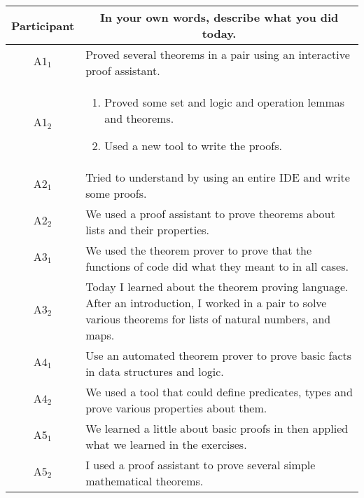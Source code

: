 \noindent
\begin{tabularx}{\linewidth}{@{}cX@{}}
  \toprule
  Participant & \multicolumn{1}{c}{
    \textbf{In your own words, describe what you did today.}
  } \\ \midrule
  $\text{A}1_{1}$ & Proved several theorems in a pair using an interactive proof assistant. \\
  $\text{A}1_{2}$ & \begin{enumerate} \item Proved some set and logic and operation lemmas and theorems. \item Used a new tool to write the proofs. \end{enumerate} \\
  $\text{A}2_{1}$ & Tried to understand \Coq{} by using an entire IDE and write some proofs. \\
  $\text{A}2_{2}$ & We used a proof assistant to prove theorems about lists and their properties. \\
  $\text{A}3_{1}$ & We used the theorem prover to prove that the functions of code did what they meant to in all cases. \\
  $\text{A}3_{2}$ & Today I learned about the \Coq{} theorem proving language.  After an introduction, I worked in a pair to solve various theorems for lists of natural numbers, and maps. \\
  $\text{A}4_{1}$ & Use an automated theorem prover to prove basic facts in data structures and logic. \\
  $\text{A}4_{2}$ & We used a tool that could define predicates, types and prove various properties about them. \\
  $\text{A}5_{1}$ & We learned a little about basic proofs in \Coq{} then applied what we learned in the exercises. \\
  $\text{A}5_{2}$ & I used a proof assistant to prove several simple mathematical theorems. \\
  \bottomrule
\end{tabularx}{\parfillskip=0pt\par}

\clearpage

